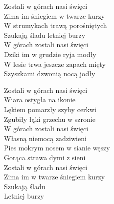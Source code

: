 \begin{text}

    Zostali w górach nasi święci\\
    Zima im śniegiem w twarze kurzy\\
    W strumykach trawą porośniętych\\
    Szukają śladu letniej burzy\\
    W górach zostali nasi święci\\
    Dziki im w grudzie ryja modły\\
    W lesie trwa jeszcze zapach mięty\\
    Szyszkami dzwonią nocą jodły


    Zostali w górach nasi święci\\
    Wiara ostygła na ikonie\\
    Lękiem pomarzły szyby cerkwi\\
    Zgubiły łąki grzechu w szronie\\
    W górach zostali nasi święci\\
    Własną niemocą zadziwieni\\
    Pies mokrym nosem w sianie węszy\\
    Gorąca strawa dymi z sieni\\
    Zostali w górach nasi święci\\
    Zima im w twarze śniegiem kurzy\\
    Szukają śladu\\
    Letniej burzy

\end{text}
